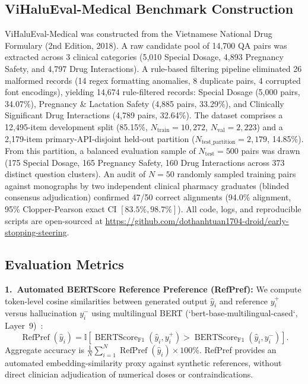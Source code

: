 \documentclass[runningheads]{llncs}
\begin{document}
\subsection{ViHaluEval-Medical Benchmark Construction}
ViHaluEval-Medical was constructed from the Vietnamese National Drug Formulary (2nd Edition, 2018). A raw candidate pool of 14,700 QA pairs was extracted across 3 clinical categories (5,010 Special Dosage, 4,893 Pregnancy Safety, and 4,797 Drug Interactions). A rule-based filtering pipeline eliminated 26 malformed records (14 regex formatting anomalies, 8 duplicate pairs, 4 corrupted font encodings), yielding 14,674 rule-filtered records: Special Dosage (5,000 pairs, 34.07\%), Pregnancy \& Lactation Safety (4,885 pairs, 33.29\%), and Clinically Significant Drug Interactions (4,789 pairs, 32.64\%). The dataset comprises a 12,495-item development split (85.15\%, $N_{\text{train}}=10{,}272$, $N_{\text{val}}=2{,}223$) and a 2,179-item primary-API-disjoint held-out partition ($N_{\text{test\_partition}}=2{,}179$, 14.85\%). From this partition, a balanced evaluation sample of $N_{\text{test}}=500$ pairs was drawn (175 Special Dosage, 165 Pregnancy Safety, 160 Drug Interactions across 373 distinct question clusters). An audit of $N=50$ randomly sampled training pairs against monographs by two independent clinical pharmacy graduates (blinded consensus adjudication) confirmed 47/50 correct alignments (94.0\% alignment, 95\% Clopper-Pearson exact CI $[83.5\%, 98.7\%]$). All code, logs, and reproducible scripts are open-sourced at \url{https://github.com/dothanhtuan1704-droid/early-stopping-steering}.

\subsection{Evaluation Metrics}
\textbf{1.~Automated BERTScore Reference Preference (RefPref):} We compute token-level cosine similarities between generated output $\hat{y}_i$ and reference $y_i^+$ versus hallucination $y_i^-$ using multilingual BERT (`bert-base-multilingual-cased`, Layer~9)~\cite{ref15}:
\begin{equation}
\operatorname{RefPref}(\hat{y}_i) = \mathbb{I}\left[\operatorname{BERTScore}_{\text{F1}}(\hat{y}_i, y_i^+) > \operatorname{BERTScore}_{\text{F1}}(\hat{y}_i, y_i^-)\right].
\end{equation}
Aggregate accuracy is $\frac{1}{N} \sum_{i=1}^N \operatorname{RefPref}(\hat{y}_i) \times 100\%$. RefPref provides an automated embedding-similarity proxy against synthetic references, without direct clinician adjudication of numerical doses or contraindications.
\end{document}
